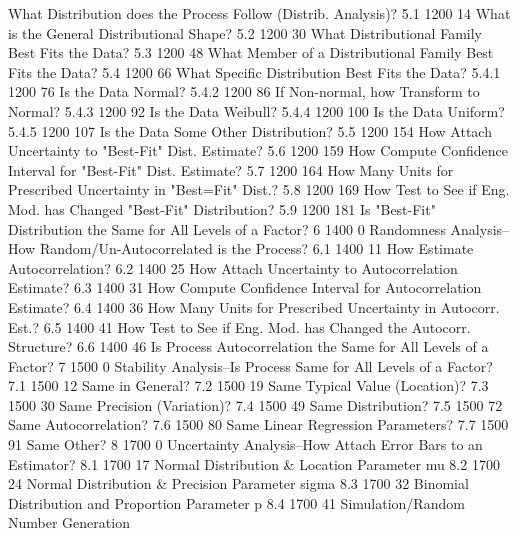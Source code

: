 What Distribution does the Process Follow (Distrib. Analysis)?
5.1             1200        14
What is the General Distributional Shape?
5.2             1200        30
What Distributional Family Best Fits the Data?
5.3             1200        48
What Member of a Distributional Family Best Fits the Data?
5.4             1200        66
What Specific Distribution Best Fits the Data?
5.4.1           1200        76
Is the Data Normal?
5.4.2           1200        86
If Non-normal, how Transform to Normal?
5.4.3           1200        92
Is the Data Weibull?
5.4.4           1200       100
Is the Data Uniform?
5.4.5           1200       107
Is the Data Some Other Distribution?
5.5             1200       154
How Attach Uncertainty to "Best-Fit" Dist. Estimate?
5.6             1200       159
How Compute Confidence Interval for "Best-Fit" Dist. Estimate?
5.7             1200       164
How Many Units for Prescribed Uncertainty in "Best=Fit" Dist.?
5.8             1200       169
How Test to See if Eng. Mod. has Changed "Best-Fit" Distribution?
5.9             1200       181
Is "Best-Fit" Distribution the Same for All Levels of a Factor?
6               1400         0
Randomness Analysis--How Random/Un-Autocorrelated is the Process?
6.1             1400        11
How Estimate Autocorrelation?
6.2             1400        25
How Attach Uncertainty to Autocorrelation Estimate?
6.3             1400        31
How Compute Confidence Interval for Autocorrelation Estimate?
6.4             1400        36
How Many Units for Prescribed Uncertainty in Autocorr. Est.?
6.5             1400        41
How Test to See if Eng. Mod. has Changed the Autocorr. Structure?
6.6             1400        46
Is Process Autocorrelation the Same for All Levels of a Factor?
7               1500         0
Stability Analysis--Is Process Same for All Levels of a Factor?
7.1             1500        12
Same in General?
7.2             1500        19
Same Typical Value (Location)?
7.3             1500        30
Same Precision (Variation)?
7.4             1500        49
Same Distribution?
7.5             1500        72
Same Autocorrelation?
7.6             1500        80
Same Linear Regression Parameters?
7.7             1500        91
Same Other?
8               1700         0
Uncertainty Analysis--How Attach Error Bars to an Estimator?
8.1             1700        17
Normal Distribution & Location Parameter mu
8.2             1700        24
Normal Distribution & Precision Parameter sigma
8.3             1700        32
Binomial Distribution and Proportion Parameter p
8.4             1700        41
Simulation/Random Number Generation
